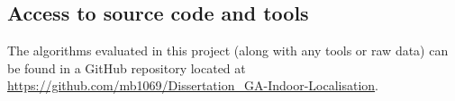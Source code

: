 \documentclass[authoryearcitations]{UoYCSproject}
\begin{document}
\clearpage


\clearpage

\begin{appendices}
	\chapter{Access to source code and tools}
	The algorithms evaluated in this project (along with any tools or raw data) can be found in a GitHub repository located at \url{https://github.com/mb1069/Dissertation_GA-Indoor-Localisation}.
\end{appendices}
\end{document}
